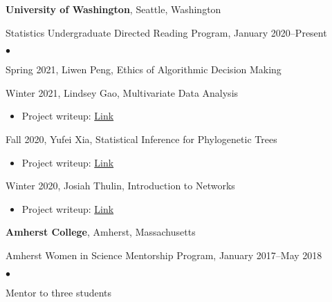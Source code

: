 \documentclass[margin,centered]{res}
\newenvironment{list1}{
  \begin{list}{\ding{113}}{%
      \setlength{\itemsep}{0in}
      \setlength{\parsep}{0in} \setlength{\parskip}{0in}
      \setlength{\topsep}{0in} \setlength{\partopsep}{0in}
      \setlength{\leftmargin}{0.17in}}}{\end{list}}
\newenvironment{list2}{
  \begin{list}{$\bullet$}{%
      \setlength{\itemsep}{0in}
      \setlength{\parsep}{0in} \setlength{\parskip}{0in}
      \setlength{\topsep}{0in} \setlength{\partopsep}{0in}
      \setlength{\leftmargin}{0.2in}}}{\end{list}}
\begin{document}
\begin{resume}
{\bf University of Washington}, Seattle, Washington
\begin{list1}
\item[] Statistics Undergraduate Directed Reading Program, January 2020--Present
\begin{list2}
\vspace*{.05in}
\item Spring 2021, Liwen Peng, Ethics of Algorithmic Decision Making
\item Winter 2021, Lindsey Gao, Multivariate Data Analysis
\begin{itemize}
\item Project writeup: \href{https://spa-drp.github.io/writeups/win2021/lindsey_writeup.pdf}{Link}
\end{itemize}
\item Fall 2020, Yufei Xia, Statistical Inference for Phylogenetic Trees
\begin{itemize}
\item Project writeup: \href{https://spa-drp.github.io/writeups/aut2020/lexi-writeup.pdf}{Link}
\end{itemize}
\item Winter 2020, Josiah Thulin, Introduction to Networks
\begin{itemize} 
\item Project writeup: \href{https://spa-drp.github.io/writeups/win2020/josiah.pdf}{Link}
\end{itemize}
\end{list2}
\end{list1}

{\bf Amherst College}, Amherst, Massachusetts
\begin{list1}
\item[] Amherst Women in Science Mentorship Program, January 2017--May 2018 
\begin{list2}
\vspace*{.05in}
\item Mentor to three students 
\end{list2}
\end{list1}









\end{resume}
\end{document}
